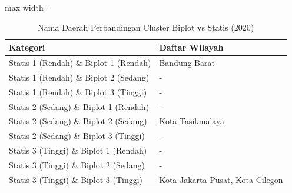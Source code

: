 \begin{table}[H]
\centering
\caption{Nama Daerah Perbandingan Cluster Biplot vs Statis (2020)} \label{tab:samplebiplot_statis_name_2020}
\begin{adjustbox}{max width=\textwidth}
\begin{tabular}{|p{4cm}|p{10cm}|}
\hline
\textbf{Kategori} & \textbf{Daftar Wilayah} \\
\hline
Statis 1 (Rendah) \& Biplot 1 (Rendah) & Bandung Barat \\
\hline
Statis 1 (Rendah) \& Biplot 2 (Sedang) & - \\
\hline
Statis 1 (Rendah) \& Biplot 3 (Tinggi) & - \\
\hline
Statis 2 (Sedang) \& Biplot 1 (Rendah) & - \\
\hline
Statis 2 (Sedang) \& Biplot 2 (Sedang) & Kota Tasikmalaya \\
\hline
Statis 2 (Sedang) \& Biplot 3 (Tinggi) & - \\
\hline
Statis 3 (Tinggi) \& Biplot 1 (Rendah) & - \\
\hline
Statis 3 (Tinggi) \& Biplot 2 (Sedang) & - \\
\hline
Statis 3 (Tinggi) \& Biplot 3 (Tinggi) & Kota Jakarta Pusat, Kota Cilegon \\
\hline
\end{tabular}
\end{adjustbox}
\end{table}